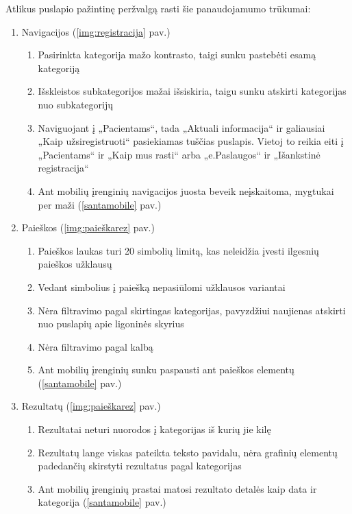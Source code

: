 \documentclass{VUMIFPSkursinis}
\begin{document}
Atlikus puslapio pažintinę peržvalgą rasti šie panaudojamumo trūkumai:
\begin{enumerate}
	\item Navigacijos (\ref{img:registracija} pav.)
	\renewcommand*{\theenumii}{\theenumi.\arabic{enumii}}
	\renewcommand{\labelenumii}{\theenumii}
	\begin{enumerate}
		\item Pasirinkta kategorija mažo kontrasto, taigi sunku pastebėti esamą kategoriją
		\item Išskleistos subkategorijos mažai išsiskiria, taigu sunku atskirti kategorijas nuo subkategorijų
		\item Naviguojant į „Pacientams“, tada „Aktuali informacija“ ir galiausiai „Kaip užsiregistruoti“ pasiekiamas tuščias puslapis. Vietoj to reikia eiti į „Pacientams“ ir „Kaip mus rasti“ arba „e.Paslaugos“ ir „Išankstinė registracija“
		\item Ant mobilių įrenginių navigacijos juosta beveik neįskaitoma, mygtukai per maži (\ref{santamobile} pav.)
	\end{enumerate}
	\item Paieškos (\ref{img:paieškarez} pav.)
	\renewcommand*{\theenumii}{\theenumi.\arabic{enumii}}
	\renewcommand{\labelenumii}{\theenumii}
	\begin{enumerate}
		\item Paieškos laukas turi 20 simbolių limitą, kas neleidžia įvesti ilgesnių paieškos užklausų
		\item Vedant simbolius į paiešką nepasiūlomi užklausos variantai
		\item Nėra filtravimo pagal skirtingas kategorijas, pavyzdžiui naujienas atskirti nuo puslapių apie ligoninės skyrius
		\item Nėra filtravimo pagal kalbą
		\item Ant mobilių įrenginių sunku paspausti ant paieškos elementų (\ref{santamobile} pav.)
	\end{enumerate}
	\item Rezultatų (\ref{img:paieškarez} pav.)
	\renewcommand*{\theenumii}{\theenumi.\arabic{enumii}}
	\renewcommand{\labelenumii}{\theenumii}
	\begin{enumerate}
		\item Rezultatai neturi nuorodos į kategorijas iš kurių jie kilę
		\item Rezultatų lange viskas pateikta teksto pavidalu, nėra grafinių elementų padedančių skirstyti rezultatus pagal kategorijas
		\item Ant mobilių įrenginių prastai matosi rezultato detalės kaip data ir kategorija (\ref{santamobile} pav.)
	\end{enumerate}
\end{enumerate}
\vspace{0,5cm}
\end{document}

